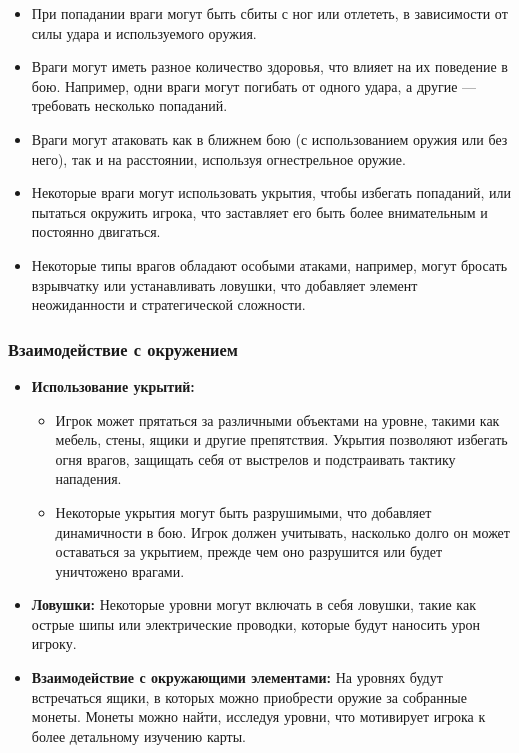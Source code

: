 \documentclass[12pt]{article}
\begin{document}
\begin{itemize}
\begin{itemize}
                    \item При попадании враги могут быть сбиты с ног или отлететь, в зависимости от силы удара и используемого оружия.
                    \item Враги могут иметь разное количество здоровья, что влияет на их поведение в бою. Например, одни враги могут погибать от одного удара, а другие — требовать несколько попаданий.
                    \item Враги могут атаковать как в ближнем бою (с использованием оружия или без него), так и на расстоянии, используя огнестрельное оружие.
                    \item Некоторые враги могут использовать укрытия, чтобы избегать попаданий, или пытаться окружить игрока, что заставляет его быть более внимательным и постоянно двигаться.
                    \item Некоторые типы врагов обладают особыми атаками, например, могут бросать взрывчатку или устанавливать ловушки, что добавляет элемент неожиданности и стратегической сложности.
                \end{itemize}
        \end{itemize}
        
        \subsubsection{Взаимодействие с окружением}

            \begin{itemize}
                \item \textbf{Использование укрытий:} 
                \begin{itemize}
                    \item Игрок может прятаться за различными объектами на уровне, такими как мебель, стены, ящики и другие препятствия. Укрытия позволяют избегать огня врагов, защищать себя от выстрелов и подстраивать тактику нападения.
                    \item Некоторые укрытия могут быть разрушимыми, что добавляет динамичности в бою. Игрок должен учитывать, насколько долго он может оставаться за укрытием, прежде чем оно разрушится или будет уничтожено врагами.
                \end{itemize}
                
                \item \textbf{Ловушки:} 
                    Некоторые уровни могут включать в себя ловушки, такие как острые шипы или электрические проводки, которые будут наносить урон игроку.
                \item \textbf{Взаимодействие с окружающими элементами:}
                        На уровнях будут встречаться ящики, в которых можно приобрести оружие за собранные монеты. Монеты можно найти, исследуя уровни, что мотивирует игрока к более детальному изучению карты.
            \end{itemize}
\end{document}
